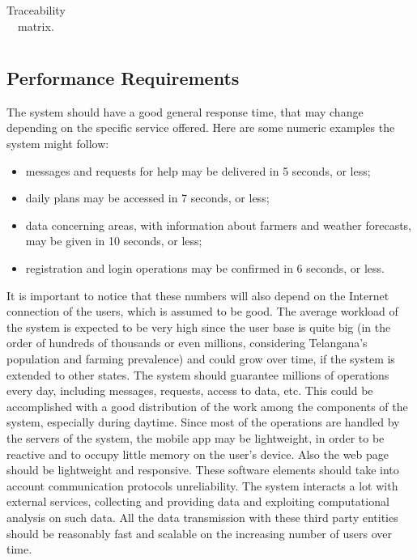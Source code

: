 \begin{table}[H]
\begin{tabular}{|l|l|l|}
    \end{tabular}
    \caption{\label{tab:traceabilityMatrix}Traceability matrix.}
\end{table}

\subsection{Performance Requirements}
The system should have a good general response time, that may change depending on the specific service offered. Here are some numeric examples the system might follow:
\begin{itemize}
    \item messages and requests for help may be delivered in 5 seconds, or less;
    \item daily plans may be accessed in 7 seconds, or less;
    \item data concerning areas, with information about farmers and weather forecasts, may be given in 10 seconds, or less;
    \item registration and login operations may be confirmed in 6 seconds, or less.
\end{itemize}
It is important to notice that these numbers will also depend on the Internet connection of the users, which is assumed to be good.
\newline
\newline
The average workload of the system is expected to be very high since the user base is quite big (in the order of hundreds of thousands or even millions, considering Telangana’s population and farming prevalence) and could grow over time, if the system is extended to other states. The system should guarantee millions of operations every day, including messages, requests, access to data, etc. This could be accomplished with a good distribution of the work among the components of the system, especially during daytime. 
\newline
\newline
Since most of the operations are handled by the servers of the system, the mobile app may be lightweight, in order to be reactive and to occupy little memory on the user’s device. Also the web page should be lightweight and responsive. These software elements should take into account communication protocols unreliability.
\newline
\newline
The system interacts a lot with external services, collecting and providing data and exploiting computational analysis on such data. All the data transmission with these third party entities should be reasonably fast and scalable on the increasing number of users over time.


